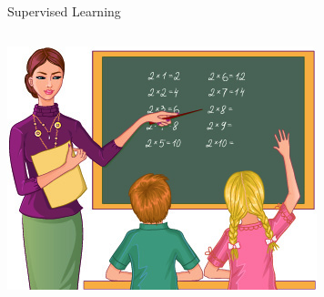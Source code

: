 \begin{frame}
{\begin{block}{Supervised Learning}
{\begin{columns}
\begin{column}{.3\linewidth}
\includegraphics[width=\textwidth]{figures/teacher.jpg}
    \end{column}
\end{columns}
}


\end{block}
}
\end{frame}

